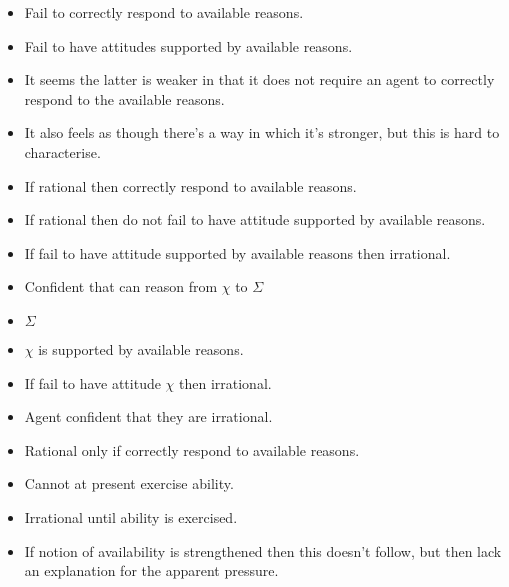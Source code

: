 \documentclass[10pt]{article}
\begin{document}
\begin{itemize}
\item Fail to correctly respond to available reasons.
\item Fail to have attitudes supported by available reasons.
\end{itemize}

\begin{itemize}
\item It seems the latter is weaker in that it does not require an agent to correctly respond to the available reasons.
\item It also feels as though there's a way in which it's stronger, but this is hard to characterise.
\end{itemize}

\begin{itemize}
\item If rational then correctly respond to available reasons.
\item If rational then do not fail to have attitude supported by available reasons.
\item If fail to have attitude supported by available reasons then irrational.
\item Confident that can reason from \(\chi\) to \(\Sigma\)
\item \(\Sigma\)
\item \(\chi\) is supported by available reasons.
\item If fail to have attitude \(\chi\) then irrational.
\item Agent confident that they are irrational.
\item Rational only if correctly respond to available reasons.
\item Cannot at present exercise ability.
\item Irrational until ability is exercised.
\end{itemize}

\begin{itemize}
\item If notion of availability is strengthened then this doesn't follow, but then lack an explanation for the apparent pressure.
\end{itemize}
\end{document}
